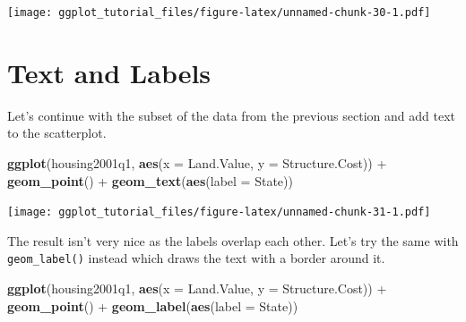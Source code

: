 \documentclass[]{article}
\newenvironment{Shaded}{\begin{snugshade}}{\end{snugshade}}
\newcommand{\KeywordTok}[1]{\textcolor[rgb]{0.13,0.29,0.53}{\textbf{{#1}}}}
\newcommand{\DataTypeTok}[1]{\textcolor[rgb]{0.13,0.29,0.53}{{#1}}}
\newcommand{\DecValTok}[1]{\textcolor[rgb]{0.00,0.00,0.81}{{#1}}}
\newcommand{\StringTok}[1]{\textcolor[rgb]{0.31,0.60,0.02}{{#1}}}
\newcommand{\NormalTok}[1]{{#1}}
\theoremstyle{definition}
\theoremstyle{definition}
\theoremstyle{definition}
\theoremstyle{remark}
\begin{document}
\begin{Shaded}
\end{Shaded}

\texttt{[image: ggplot\_tutorial\_files/figure-latex/unnamed-chunk-30-1.pdf]}

\section{Text and Labels}\label{text-and-labels}

Let's continue with the subset of the data from the previous section and
add text to the scatterplot.

\begin{Shaded}
\begin{Highlighting}[]
\KeywordTok{ggplot}\NormalTok{(housing2001q1, }\KeywordTok{aes}\NormalTok{(}\DataTypeTok{x =} \NormalTok{Land.Value, }\DataTypeTok{y =} \NormalTok{Structure.Cost)) +}\StringTok{ }
\StringTok{  }\KeywordTok{geom_point}\NormalTok{() +}
\StringTok{  }\KeywordTok{geom_text}\NormalTok{(}\KeywordTok{aes}\NormalTok{(}\DataTypeTok{label =} \NormalTok{State))}
\end{Highlighting}
\end{Shaded}

\texttt{[image: ggplot\_tutorial\_files/figure-latex/unnamed-chunk-31-1.pdf]}

The result isn't very nice as the labels overlap each other. Let's try
the same with \texttt{geom\_label()} instead which draws the text with a
border around it.

\begin{Shaded}
\begin{Highlighting}[]
\KeywordTok{ggplot}\NormalTok{(housing2001q1, }\KeywordTok{aes}\NormalTok{(}\DataTypeTok{x =} \NormalTok{Land.Value, }\DataTypeTok{y =} \NormalTok{Structure.Cost)) +}\StringTok{ }
\StringTok{  }\KeywordTok{geom_point}\NormalTok{() +}
\StringTok{  }\KeywordTok{geom_label}\NormalTok{(}\KeywordTok{aes}\NormalTok{(}\DataTypeTok{label =} \NormalTok{State))}
\end{Highlighting}
\end{Shaded}
\end{document}
